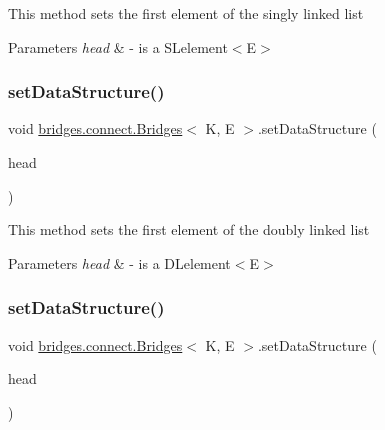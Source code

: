 This method sets the first element of the singly linked list 
\begin{DoxyParams}{Parameters}
{\em head} & -\/ is a S\+Lelement$<$\+E$>$ \\
\hline
\end{DoxyParams}
\hypertarget{classbridges_1_1connect_1_1_bridges_a383877f85bb048d47560e76f359e1bda}{}\label{classbridges_1_1connect_1_1_bridges_a383877f85bb048d47560e76f359e1bda} 
\subsubsection{\texorpdfstring{set\+Data\+Structure()}{setDataStructure()}\hspace{0.1cm}{\footnotesize\ttfamily [4/12]}}
{\footnotesize\ttfamily void \hyperlink{classbridges_1_1connect_1_1_bridges}{bridges.\+connect.\+Bridges}$<$ K, E $>$.set\+Data\+Structure (\begin{DoxyParamCaption}\item[{\hyperlink{classbridges_1_1base_1_1_d_lelement}{D\+Lelement}$<$ E $>$}]{head }\end{DoxyParamCaption})}

This method sets the first element of the doubly linked list


\begin{DoxyParams}{Parameters}
{\em head} & -\/ is a D\+Lelement$<$\+E$>$ \\
\hline
\end{DoxyParams}
\hypertarget{classbridges_1_1connect_1_1_bridges_a285a7af5ad0594d4eeca51277e627c89}{}\label{classbridges_1_1connect_1_1_bridges_a285a7af5ad0594d4eeca51277e627c89} 
\subsubsection{\texorpdfstring{set\+Data\+Structure()}{setDataStructure()}\hspace{0.1cm}{\footnotesize\ttfamily [5/12]}}
{\footnotesize\ttfamily void \hyperlink{classbridges_1_1connect_1_1_bridges}{bridges.\+connect.\+Bridges}$<$ K, E $>$.set\+Data\+Structure (\begin{DoxyParamCaption}\item[{\hyperlink{classbridges_1_1base_1_1_circ_s_lelement}{Circ\+S\+Lelement}$<$ E $>$}]{head }\end{DoxyParamCaption})}

